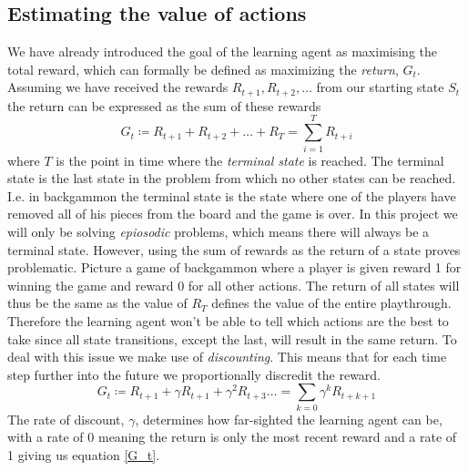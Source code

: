 \documentclass[11pt]{article}
\begin{document}
\maketitle


\subsection{Estimating the value of actions}\label{est_vals}

We have already introduced the goal of the learning agent as
maximising the total reward, which can formally be defined as maximizing the \textit{return}, $G_t$.
Assuming we have received the rewards $R_{t+1}, R_{t+2}, \dots$ from our starting state $S_t$
the return can be expressed as the sum of these rewards
\begin{equation}\label{G_t}
    G_t \coloneqq R_{t+1} + R_{t+2} + \hdots + R_{T} = \sum\limits_{i = 1}^T R_{t+i}
\end{equation}
where $T$ is the point in time where the \textit{terminal state} is reached.
The terminal state is the last state in the problem from which
no other states can be reached.
I.e. in backgammon the terminal state is the state where one of the players
have removed all of his pieces from the board and the game is over.
In this project we will only be solving \textit{epiosodic} problems, which
means there will always be a terminal state.
However, using the sum of rewards as the return of a state proves problematic.
Picture a game of backgammon where a player is given reward 1 for winning the game
and reward 0 for all other actions.
The return of all states will thus be the same
as the value of $R_T$ defines the value of the entire playthrough.
Therefore the learning agent won't be able to tell which actions are the best to take
since all state transitions, except the last, will result in the same return.
To deal with this issue we make use of \textit{discounting}.
This means that for each time step further into the future
we proportionally discredit the reward.
\begin{equation}\label{gammaG_t}
    G_t \coloneqq R_{t+1} + \gamma R_{t+1} + \gamma^2 R_{t+3} \dots = \sum\limits_{k=0} \gamma^k R_{t+k+1}
\end{equation}
The rate of discount, $\gamma$, determines how far-sighted the learning agent can be,
with a rate of 0 meaning the return is only the most recent reward and a rate of 1 giving us equation \ref{G_t}.
\end{document}
